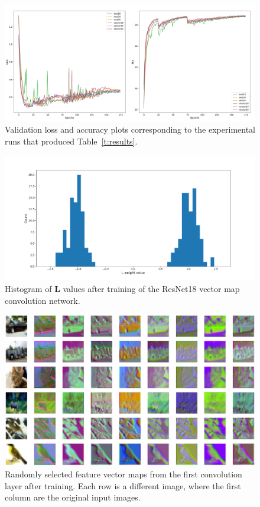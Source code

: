 \documentclass[14pt,a4paper]{article}
\begin{document}
\begin{figure}[h]
	\centering
		\includegraphics[width=1.0\columnwidth]{figures/loss.png}
		\caption{Validation loss and accuracy plots corresponding to the experimental runs that produced Table~\ref{t:results}.}
	\label{f:loss}
\end{figure}

\begin{figure}[h]
	\centering
		\includegraphics[width=1.0\columnwidth]{figures/hist.png}
		\caption{Histogram of $\textbf{L}$ values after training of the ResNet18 vector map convolution network.}
	\label{f:hist}
\end{figure}

\begin{figure}[h]
	\centering
		\includegraphics[width=1.0\columnwidth]{figures/samples.png}
		\caption{Randomly selected feature vector maps from the first convolution layer after training. Each row is a different image, where the first column are the original input images.}
	\label{f:samples}
\end{figure}
\end{document}
